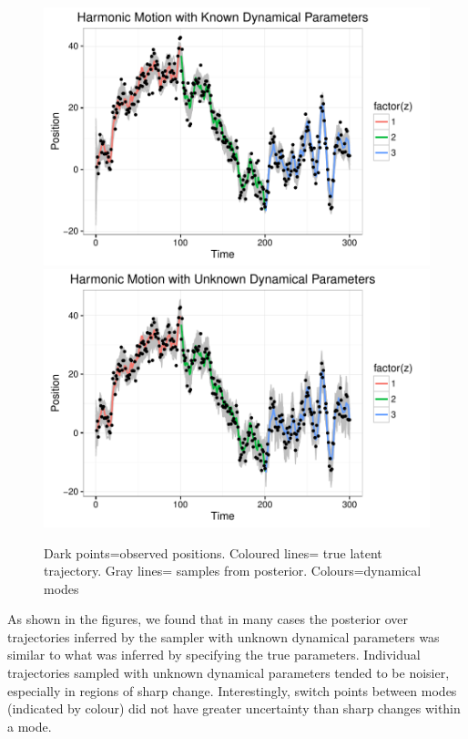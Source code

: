 \documentclass{article} %
\begin{document}
\begin{figure}
  \includegraphics[width = \linewidth]{"./plot/lds/03_harmonic_known"}
  \includegraphics[width = \linewidth]{"./plot/lds/04_harmonic_unknown"}
  \caption{Dark points=observed positions. Coloured lines= true latent trajectory. Gray lines= samples from posterior. Colours=dynamical modes}
\end{figure}
\clearpage

As shown in the figures, we found that in many cases the posterior over trajectories inferred by the sampler with unknown dynamical parameters was similar to what was inferred by specifying the true parameters. Individual trajectories sampled with unknown dynamical parameters tended to be noisier, especially in regions of sharp change. Interestingly, switch points between modes (indicated by colour) did not have greater uncertainty than sharp changes within a mode.
\end{document}
